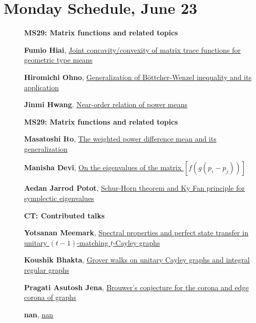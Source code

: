 \documentclass[ILAS2025-program.tex]{subfiles}
\begin{document}
\section*{Monday Schedule, June 23 }
        
        \begin{description}
    \item[] {\color{mstitle}\textbf{MS29: Matrix functions and related topics}} 
    \item[] \hypertarget{up0013}{}\textbf{Fumio Hiai}, \hyperlink{down0013}{Joint concavity/convexity of matrix trace functions for geometric type means}
        \item[] \hypertarget{up0014}{}\textbf{Hiromichi Ohno}, \hyperlink{down0014}{Generalization of B\"ottcher-Wenzel inequality and its application}
        \item[] \hypertarget{up0015}{}\textbf{Jinmi Hwang}, \hyperlink{down0015}{Near-order relation of power means}
        \end{description}
    \begin{description}
    \item[] {\color{mstitle}\textbf{MS29: Matrix functions and related topics}} 
    \item[] \hypertarget{up0046}{}\textbf{Masatoshi Ito}, \hyperlink{down0046}{The weighted power difference mean and its generalization}
        \item[] \hypertarget{up0047}{}\textbf{Manisha Devi}, \hyperlink{down0047}{On the eigenvalues of the matrix $[f(g(p_i-p_j))]$}
        \item[] \hypertarget{up0048}{}\textbf{Aedan Jarrod Potot}, \hyperlink{down0048}{Schur-Horn theorem and Ky Fan principle for symplectic eigenvalues}
        \end{description}
    \begin{description}
    \item[] {\color{mstitle}\textbf{CT: Contributed talks}} 
    \item[] \hypertarget{up0080}{}\textbf{Yotsanan Meemark}, \hyperlink{down0080}{Spectral properties and perfect state transfer in unitary $(t-1)$-matching $t$-Cayley graphs}
        \item[] \hypertarget{up0081}{}\textbf{Koushik Bhakta}, \hyperlink{down0081}{Grover walks on unitary Cayley graphs and integral regular graphs}
        \item[] \hypertarget{up0082}{}\textbf{Pragati Asutosh Jena}, \hyperlink{down0082}{Brouwer's conjecture for the corona and edge corona of graphs}
        \item[] \hypertarget{up0083}{}\textbf{nan}, \hyperlink{down0083}{nan}
        \end{description}
    \newpage
\end{document}
